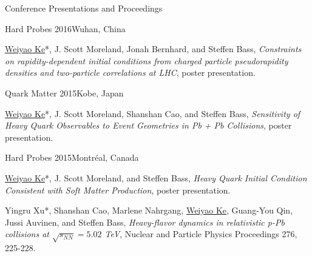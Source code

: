 \documentclass{resume} %
\begin{document}
\begin{rSection}{Conference Presentations and Proceedings}
\begin{Conference}{Hard Probes 2016}{Wuhan, China}
\item \underline{Weiyao Ke}*, J. Scott Moreland, Jonah Bernhard, and Steffen Bass, {\it Constraints on rapidity-dependent initial conditions from charged particle pseudorapidity densities and two-particle correlations at LHC}, poster presentation.
\end{Conference}

\begin{Conference}{Quark Matter 2015}{Kobe, Japan}
\item \underline{Weiyao Ke}*, J. Scott Moreland, Shanshan Cao, and Steffen Bass, {\it Sensitivity of Heavy Quark Observables to Event Geometries in Pb + Pb Collisions}, poster presentation.
\end{Conference}

\begin{Conference}{Hard Probes 2015}{Montr\'eal, Canada}
\item \underline{Weiyao Ke}*, J. Scott Moreland, and Steffen Bass, {\it Heavy Quark Initial Condition Consistent with Soft Matter Production}, poster presentation.
\item Yingru Xu*, Shanshan Cao, Marlene Nahrgang, \underline{Weiyao Ke}, Guang-You Qin, Jussi Auvinen, and Steffen Bass, {\it Heavy-flavor dynamics in relativistic p-Pb collisions at $\sqrt{s_{NN}}=5.02$ TeV}, Nuclear and Particle Physics Proceedings 276, 225-228.
\end{Conference}

\end{rSection}






\end{document}
